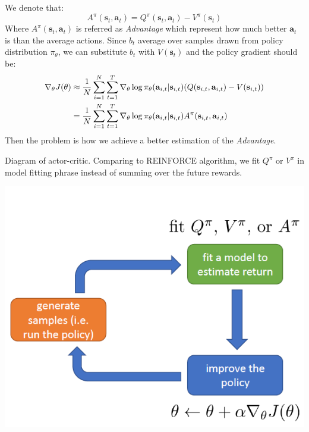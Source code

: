 \documentclass{tufte-handout}
\newcommand{\s}{\mathbf{s}}
\newcommand{\act}{\mathbf{a}}
\begin{document}
We denote that:
\begin{equation}
\label{eq:7}
A^\pi (\s_t, \act_t) = Q^\pi (\s_t, \act_t) - V^\pi(\s_t)
\end{equation}
Where $A^\pi (\s_t, \act_t)$ is referred as \emph{Advantage} which represent how much better $\act_t$ is than the average actions.
Since $b_t$ average over samples drawn from policy distribution $\pi_\theta$, we can substitute $b_t$ with $V(\s_t)$ and the policy gradient should be:
\begin{align}
\label{eq:8}
\nabla _\theta J(\theta)   & \approx \frac{1}{N} \sum_{i=1} ^ {N} \sum_{t=1}^T \nabla_\theta \log \pi_\theta(\act_{i,t}| \s_{i,t})
  (Q(\s_{i,t}, \act_{i,t}) - V(\s_{i, t})) \notag \\
  & = \frac{1}{N} \sum_{i=1} ^ {N} \sum_{t=1}^T \nabla_\theta \log \pi_\theta(\act_{i,t}| \s_{i,t})
  A^\pi(\s_{i,t}, \act_{i,t})
\end{align}
Then the problem is how we  achieve a better estimation of the \emph{Advantage}.
\begin{marginfigure}
    \caption{Diagram of actor-critic. Comparing to REINFORCE algorithm, we fit $Q^\pi$ or $V^\pi$ in model fitting phrase instead of summing over the future rewards.}
    \includegraphics[width=\linewidth]{diagram}
    \label{fig:diagram}
\end{marginfigure}
\end{document}
